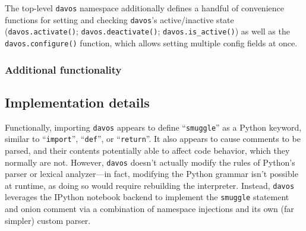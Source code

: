 \documentclass[preprint,12pt,a4paper]{elsarticle}
\begin{document}
\noindent The top-level \texttt{davos} namespace additionally defines a handful of convenience functions for setting and checking \texttt{davos}'s active/inactive state (\texttt{davos.activate()}; \texttt{davos.deactivate()}; \texttt{davos.is\_active()}) as well as the \texttt{davos.configure()} function, which allows setting multiple config fields at once.


\subsubsection{Additional functionality}


\subsection{Implementation details}\label{subsec:implementation}
Functionally, importing \texttt{davos} appears to define ``\texttt{smuggle}'' as a Python keyword, similar to ``\texttt{import}'', ``\texttt{def}'', or ``\texttt{return}''. It also appears to cause comments to be parsed, and their contents potentially able to affect code behavior, which they normally are not. However, \texttt{davos} doesn't actually modify the rules of Python's parser or lexical analyzer---in fact, modifying the Python grammar isn't possible at runtime, as doing so would require rebuilding the interpreter. Instead, \texttt{davos} leverages the IPython notebook backend to implement the \texttt{smuggle} statement and onion comment via a combination of namespace injections and its own (far simpler) custom parser.
\end{document}
